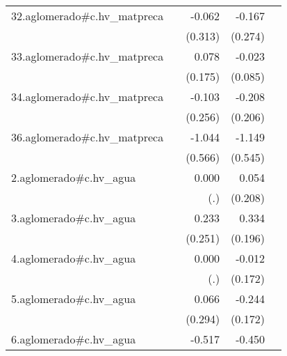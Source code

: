 {\begin{longtable}{l*{4}{D{.}{.}{-1}}}
\addlinespace
32.aglomerado#c.hv\_matpreca&                     &      -0.062         &      -0.167         &                     \\
            &                     &     (0.313)         &     (0.274)         &                     \\
\addlinespace
33.aglomerado#c.hv\_matpreca&                     &       0.078         &      -0.023         &                     \\
            &                     &     (0.175)         &     (0.085)         &                     \\
\addlinespace
34.aglomerado#c.hv\_matpreca&                     &      -0.103         &      -0.208         &                     \\
            &                     &     (0.256)         &     (0.206)         &                     \\
\addlinespace
36.aglomerado#c.hv\_matpreca&                     &      -1.044         &      -1.149\sym{*}  &                     \\
            &                     &     (0.566)         &     (0.545)         &                     \\
\addlinespace
2.aglomerado#c.hv\_agua&                     &       0.000         &       0.054         &                     \\
            &                     &         (.)         &     (0.208)         &                     \\
\addlinespace
3.aglomerado#c.hv\_agua&                     &       0.233         &       0.334         &                     \\
            &                     &     (0.251)         &     (0.196)         &                     \\
\addlinespace
4.aglomerado#c.hv\_agua&                     &       0.000         &      -0.012         &                     \\
            &                     &         (.)         &     (0.172)         &                     \\
\addlinespace
5.aglomerado#c.hv\_agua&                     &       0.066         &      -0.244         &                     \\
            &                     &     (0.294)         &     (0.172)         &                     \\
\addlinespace
6.aglomerado#c.hv\_agua&                     &      -0.517         &      -0.450\sym{*}  &                     \\

\end{longtable}}
